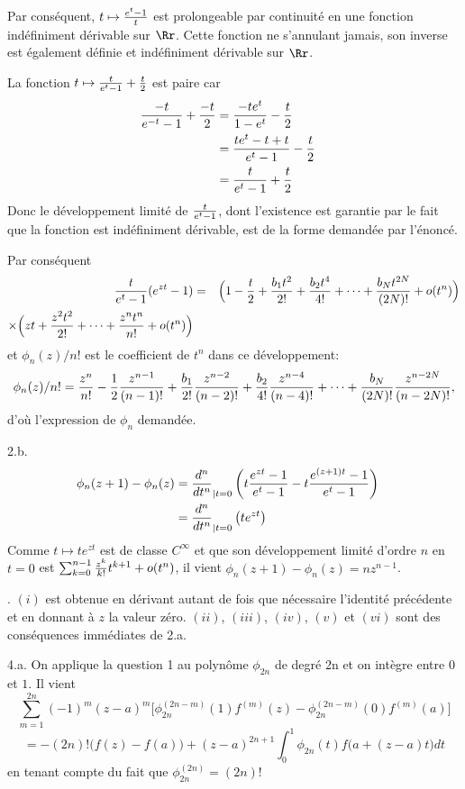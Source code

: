 {\begin{enumerate}
{Par conséquent, $t\mapsto{e^t-1 \over t}$ est prolongeable par continuité en une
fonction indéfiniment dérivable sur $\Rr$. Cette fonction ne s'annulant jamais,
son inverse est également définie et indéfiniment dérivable sur $\Rr$.



La fonction $t \mapsto {t \over e^t-1} + {t\over2}$ est paire car
$$\begin{aligned}
{-t \over e^{-t}-1} + {-t\over2}
&= {-t e^t \over 1-e^t} - {t\over2}  \cr
&= {t e^t - t + t \over e^t-1} - {t\over2}  \cr
&= {t \over e^t-1} + {t\over2}  \cr
\end{aligned}
$$
Donc  le développement limité de ${t \over e^t-1}$, dont l'existence est garantie par
le fait que la fonction est indéfiniment dérivable, est de la forme demandée par
l'énoncé.

Par conséquent
\begin{eqnarray*}
{t \over e^t-1} (e^{zt}-1) &=&
\Big( 1-{t\over2}+ {b_1 t^2 \over 2!} + {b_2 t^4 \over 4!} + \dots 
+  {b_N t^{2N} \over (2N)!} + o(t^n) \Big) 
\\
\times \Big( zt + {z^2 t^2 \over 2!} + \dots + {z^n t^n \over n!} + o(t^n)   \Big)   
 \end{eqnarray*}
et $\phi_n(z)/n!$ est le coefficient de $t^n$ dans ce développement:
$$\phi_n(z)/n!= {z^n\over n!} - {1\over2} {z^{n-1}\over(n-1)!}
+ {b_1\over2!}{z^{n-2}\over(n-2)!} + {b_2\over4!}{z^{n-4}\over(n-4)!}
+ \dots + {b_N\over(2N)!}{z^{n-2N}\over(n-2N)!},$$
d'où l'expression de $\phi_n$ demandée.

\medskip
2.b. 
$$\begin{aligned}
\phi_n(z+1)-\phi_n(z)&={d^n \over dt^n}_{| t=0}
                      \left(t{e^{zt}-1 \over e^t-1} - t{e^{(z+1)t}-1 \over e^t-1} \right) \cr
                     &={d^n \over dt^n}_{| t=0} \left(t e^{zt} \right) \cr
\end{aligned}
$$
Comme $t \mapsto t e^{zt}$ est de classe $C^\infty$ et que son développement limité
d'ordre $n$ en $t=0$ est $\sum_{k=0}^{n-1} {z^k\over k!} t^{k+1} + o(t^n)$, il vient
$\phi_n(z+1)-\phi_n(z)=nz^{n-1}$.


. $(i)$ est obtenue en dérivant autant de fois que nécessaire l'identité précédente
et en donnant à $z$ la valeur zéro.
   $(ii)$, $(iii)$, $(iv)$, $(v)$ et $(vi)$ sont des conséquences immédiates de 2.a.

4.a. On applique la question 1 au polynôme $\phi_{2n}$ de degré 2n et on
intègre entre $0$ et $1$. Il vient
\[
\sum_{m=1}^{2n} (-1)^m (z-a)^m \Big[ \phi_{2n}^{(2n-m)}(1) f^{(m)}(z)
- \phi_{2n}^{(2n-m)}(0) f^{(m)}(a)  \Big]
\]\[
 = -(2n)! \bigl( f(z)-f(a) \bigr) + (z-a)^{2n+1} \int_0^1 \phi_{2n}(t)f\Big( a+(z-a)t \Big)dt
\]
en tenant compte du fait que $\phi_{2n}^{(2n)}=(2n)!$

}
\end{enumerate}}

